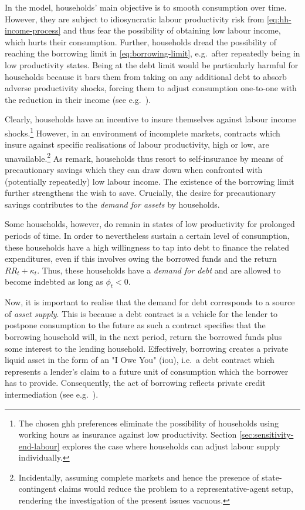 \documentclass[12pt]{article} %
\numberwithin{equation}{section} %
\numberwithin{figure}{section}
\numberwithin{table}{section}
\begin{document}
In the model, households' main objective is to smooth consumption over time. However, they are subject to idiosyncratic labour productivity risk from \eqref{eq:hh-income-process} and thus fear the possibility of obtaining low labour income, which hurts their consumption. Further, households dread the possibility of reaching the borrowing limit in \eqref{eq:borrowing-limit}, e.g.~after repeatedly being in low productivity states. Being at the debt limit would be particularly harmful for households because it bars them from taking on any additional debt to absorb adverse productivity shocks, forcing them to adjust consumption one-to-one with the reduction in their income (see e.g.~\cite{carroll2021}). 

Clearly, households have an incentive to insure themselves against labour income shocks.\footnote{The chosen \Gls{ghh} preferences eliminate the possibility of households using working hours as insurance against low productivity. Section \ref{sec:sensitivity-end-labour} explores the case where households can adjust labour supply individually.} However, in an environment of incomplete markets, contracts which insure against specific realisations of labour productivity, high or low, are unavailable.\footnote{Incidentally, assuming complete markets and hence the presence of state-contingent claims would reduce the problem to a representative-agent setup, rendering the investigation of the present issues vacuous.} As \textcite{heath2009} remark, households thus resort to self-insurance by means of precautionary savings which they can draw down when confronted with (potentially repeatedly) low labour income. The existence of the borrowing limit further strengthens the wish to save. Crucially, the desire for precautionary savings contributes to the \textit{demand for assets} by households. %

Some households, however, do remain in states of low productivity for prolonged periods of time. In order to nevertheless sustain a certain level of consumption, these households have a high willingness to tap into debt to finance the related expenditures, even if this involves owing the borrowed funds and the return $RR_t + \kappa_t$. Thus, these households have a \textit{demand for debt} and are allowed to become indebted as long as $\phi_t < 0$.

Now, it is important to realise that the demand for debt corresponds to a source of \textit{asset supply}. This is because a debt contract is a vehicle for the lender to postpone consumption to the future as such a contract specifies that the borrowing household will, in the next period, return the borrowed funds plus some interest to the lending household. Effectively, borrowing creates a private liquid asset in the form of an "I Owe You" (\Gls{iou}), i.e.~a debt contract which represents a lender's claim to a future unit of consumption which the borrower has to provide. Consequently, the act of borrowing reflects private credit intermediation (see e.g.~\cite{bayer2023}).
\end{document}
